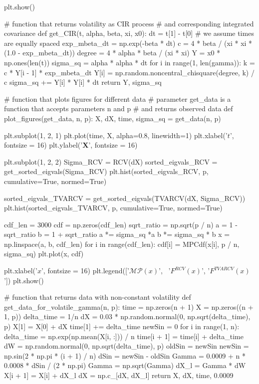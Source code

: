 \documentclass[a4paper,11pt]{book}
\theoremstyle{plain}
\theoremstyle{definition}
\begin{document}
\begin{python}
    plt.show()
    

# function that returns volatility as CIR process
# and corresponding integrated covariance
def get_CIR(t, alpha, beta, xi, x0):
    dt = t[1] - t[0] # we assume times are equally spaced
    exp_mbeta_dt = np.exp(-beta * dt)
    c = 4 * beta / (xi * xi * (1.0 - exp_mbeta_dt))
    degree = 4 * alpha * beta / (xi * xi)
    Y = x0 * np.ones(len(t))
    sigma_sq = alpha * alpha * dt
    for i in range(1, len(gamma)):
        k = c * Y[i - 1] * exp_mbeta_dt
        Y[i] = np.random.noncentral_chisquare(degree, k) / c
        sigma_sq += Y[i] * Y[i] * dt
    return Y, sigma_sq
	    
	    
# function that plots figures for different data
# parameter get_data is a function that accepts parameters n and p
# and returns observed data
def plot_figures(get_data, n, p):
    X, dX, time, sigma_sq = get_data(n, p)
    
    plt.subplot(1, 2, 1)
    plt.plot(time, X, alpha=0.8, linewidth=1)
    plt.xlabel('$t$', fontsize = 16)
    plt.ylabel('$\mathbf{X}$', fontsize = 16)    
    
    plt.subplot(1, 2, 2)
    Sigma_RCV = RCV(dX)
    sorted_eigvals_RCV = get_sorted_eigvals(Sigma_RCV)
    plt.hist(sorted_eigvals_RCV, p, cumulative=True, normed=True)
    
    sorted_eigvals_TVARCV = get_sorted_eigvals(TVARCV(dX, Sigma_RCV))
    plt.hist(sorted_eigvals_TVARCV, p, cumulative=True, normed=True)
    
    cdf_len = 3000
    cdf = np.zeros(cdf_len)
    sqrt_ratio = np.sqrt(p / n)
    a = 1 - sqrt_ratio
    b = 1 + sqrt_ratio
    a *= sigma_sq *a
    b *= sigma_sq * b
    x = np.linspace(a, b, cdf_len)
    for i in range(cdf_len):
        cdf[i] = MPCdf(x[i], p / n, sigma_sq)
    plt.plot(x, cdf)
    
    plt.xlabel('$x$', fontsize = 16)
    plt.legend(['$\mathcal{MP}(x)$', \
                '$F^{RCV}(x)$', '$F^{TVARCV}(x)$'])
    plt.show()
    
    
# function that returns data with non-constant volatility
def get_data_for_volatile_gamma(n, p):
    time = np.zeros(n + 1)
    X = np.zeros((n + 1, p))
    delta_time = 1/n
    dX = 0.03 * np.random.normal(0, np.sqrt(delta_time), p)
    X[1] = X[0] + dX
    time[1] += delta_time
    newSin = 0
    for i in range(1, n):
        delta_time = np.exp(np.mean(X[i, :])) / n
        time[i + 1] = time[i] + delta_time
        dW = np.random.normal(0, np.sqrt(delta_time), p)
        oldSin = newSin
        newSin = np.sin(2 * np.pi * (i + 1) / n)
        dSin = newSin - oldSin
        Gamma = 0.0009 + n * 0.0008 * dSin / (2 * np.pi)
        Gamma = np.sqrt(Gamma)
        dX_l = Gamma * dW
        X[i + 1] = X[i] + dX_l
        dX = np.c_[dX, dX_l]
    return X, dX, time, 0.0009
    


\end{python}
\end{document}
